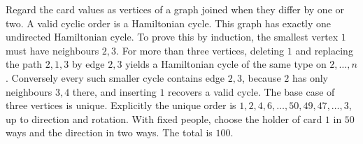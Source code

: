 Regard the card values as vertices of a graph joined when they differ by one or two. A valid cyclic order is a Hamiltonian cycle. This graph has exactly one undirected Hamiltonian cycle. To prove this by induction, the smallest vertex $1$ must have neighbours $2,3$. For more than three vertices, deleting $1$ and replacing the path $2,1,3$ by edge $2,3$ yields a Hamiltonian cycle of the same type on $2,\ldots,n$. Conversely every such smaller cycle contains edge $2,3$, because $2$ has only neighbours $3,4$ there, and inserting $1$ recovers a valid cycle. The base case of three vertices is unique.
Explicitly the unique order is $1,2,4,6,\ldots,50,49,47,\ldots,3$, up to direction and rotation. With fixed people, choose the holder of card $1$ in $50$ ways and the direction in two ways. The total is $\boxed{100}$.
